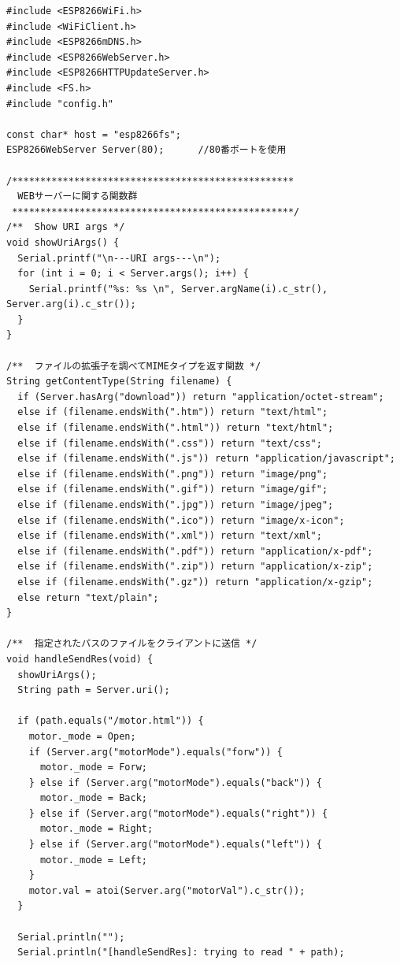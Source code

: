 \begin{verbatim}
#include <ESP8266WiFi.h>
#include <WiFiClient.h>
#include <ESP8266mDNS.h>
#include <ESP8266WebServer.h>
#include <ESP8266HTTPUpdateServer.h>
#include <FS.h>
#include "config.h"

const char* host = "esp8266fs";
ESP8266WebServer Server(80);      //80番ポートを使用

/**************************************************
  WEBサーバーに関する関数群
 **************************************************/
/**  Show URI args */
void showUriArgs() {
  Serial.printf("\n---URI args---\n");
  for (int i = 0; i < Server.args(); i++) {
    Serial.printf("%s: %s \n", Server.argName(i).c_str(), Server.arg(i).c_str());
  }
}

/**  ファイルの拡張子を調べてMIMEタイプを返す関数 */
String getContentType(String filename) {
  if (Server.hasArg("download")) return "application/octet-stream";
  else if (filename.endsWith(".htm")) return "text/html";
  else if (filename.endsWith(".html")) return "text/html";
  else if (filename.endsWith(".css")) return "text/css";
  else if (filename.endsWith(".js")) return "application/javascript";
  else if (filename.endsWith(".png")) return "image/png";
  else if (filename.endsWith(".gif")) return "image/gif";
  else if (filename.endsWith(".jpg")) return "image/jpeg";
  else if (filename.endsWith(".ico")) return "image/x-icon";
  else if (filename.endsWith(".xml")) return "text/xml";
  else if (filename.endsWith(".pdf")) return "application/x-pdf";
  else if (filename.endsWith(".zip")) return "application/x-zip";
  else if (filename.endsWith(".gz")) return "application/x-gzip";
  else return "text/plain";
}

/**  指定されたパスのファイルをクライアントに送信 */
void handleSendRes(void) {
  showUriArgs();
  String path = Server.uri();

  if (path.equals("/motor.html")) {
    motor._mode = Open;
    if (Server.arg("motorMode").equals("forw")) {
      motor._mode = Forw;
    } else if (Server.arg("motorMode").equals("back")) {
      motor._mode = Back;
    } else if (Server.arg("motorMode").equals("right")) {
      motor._mode = Right;
    } else if (Server.arg("motorMode").equals("left")) {
      motor._mode = Left;
    }
    motor.val = atoi(Server.arg("motorVal").c_str());
  }

  Serial.println("");
  Serial.println("[handleSendRes]: trying to read " + path);


\end{verbatim}
